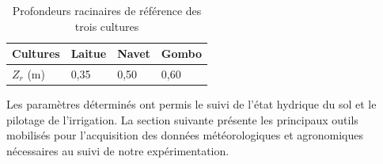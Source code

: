 \begin{table}[H]
    \centering
    \caption{Profondeurs racinaires de référence des trois cultures}
    \label{tab:profondeurs_racinaires}
    \begin{tabular}{|p{3cm}|p{3cm}|p{3cm}|p{3cm}|}
        \hline
        \textbf{Cultures} & \textbf{Laitue} & \textbf{Navet} & \textbf{Gombo} \\
        \hline
        $Z_r$ (m) & 0,35 & 0,50 & 0,60 \\
        \hline
    \end{tabular}
\end{table}

Les paramètres déterminés ont permis le suivi de l’état hydrique du sol et le pilotage de l’irrigation. 
La section suivante présente les principaux outils mobilisés pour l’acquisition des données météorologiques et agronomiques nécessaires au suivi de notre expérimentation.
